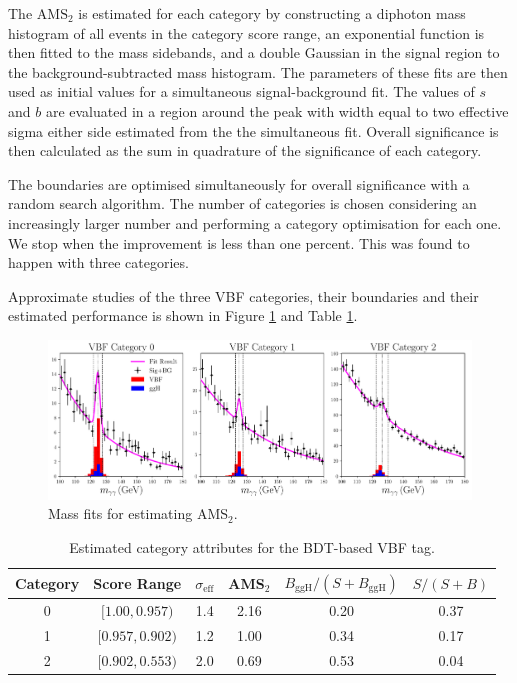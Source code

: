 The $\mathrm{AMS}_2$ is estimated for each category by constructing a diphoton mass histogram of all events in the category score range, an exponential function is then fitted to the mass sidebands, and a double Gaussian in the signal region to the background-subtracted mass histogram. The parameters of these fits are then used as initial values for a simultaneous signal-background fit. 
The values of $s$ and $b$ are evaluated in a region around the peak with width equal to two effective sigma either side estimated from the the simultaneous fit. Overall significance is then calculated as the sum in quadrature of the significance of each category. 

The boundaries are optimised simultaneously for overall significance with a random search algorithm. The number of categories is chosen considering an increasingly larger number and performing a category optimisation for each one. We stop when the improvement is less than one percent. This was found to happen with three categories. 

Approximate studies of the three VBF categories, their boundaries and their estimated performance is shown in Figure \ref{fig:event_categorisaton:bdt_mass_fits} and Table \ref{tab:event_selection:legacy_cats}.
\begin{figure}[h!]
    \includegraphics[width=1.0\textwidth]{figures/event_selection/BDT_mass_fits.pdf}
    \caption{Mass fits for estimating AMS$_2$.}
    \label{fig:event_categorisaton:bdt_mass_fits}
\end{figure}
\begin{table}[h!]
    \begin{tabular}{ c || c | c | c | c | c }
        Category & Score Range & $\sigma_{\mathrm{eff}}$ & AMS$_2$ & $B_{\mathrm{ggH}}/(S+B_{\mathrm{ggH}})$ & $S/(S+B)$ \\
        \hline
        0 & $[1.00, 0.957)$     & 1.4 &  2.16 & 0.20 & 0.37 \\
        1 & $[0.957, 0.902)$ & 1.2 &  1.00  & 0.34 & 0.17 \\
        2 & $[0.902, 0.553)$ & 2.0 &  0.69 & 0.53 & 0.04 \\
\end{tabular}
    \caption{Estimated category attributes for the BDT-based VBF tag.}
    \label{tab:event_selection:legacy_cats}
\end{table}






